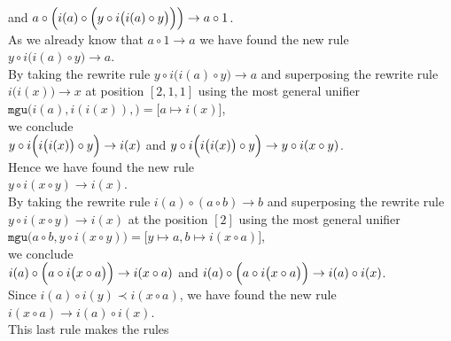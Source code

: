 \quad and \quad
$a \circ \Bigl(i(a) \circ \Bigl(y \circ i\bigl(i(a)\circ y\bigr)\Bigr)\Bigr) \rightarrow a \circ 1$.
\\[0.2cm]
As we already know that $a \circ 1 \rightarrow a$ we have found the new rule
\\[0.2cm]
\hspace*{1.3cm}
$y \circ i\bigl(i(a)\circ y\bigr) \rightarrow a$.
\\[0.2cm]
By taking the rewrite rule $y \circ i\bigl(i(a)\circ y\bigr) \rightarrow a$ and superposing the rewrite rule $i\bigl(i(x)\bigr)
\rightarrow x$ at
position $[2, 1, 1]$ using the most general unifier
\\[0.2cm]
\hspace*{1.3cm}
$\mathtt{mgu}\bigl(i(a), i(i(x)),\bigr) = \bigl[a \mapsto i(x)\bigr]$,
\\[0.2cm]
we conclude
\\[0.2cm]
\hspace*{1.3cm}
$y \circ i\Bigl(i\bigl(i(x)\bigr)\circ y\Bigr) \rightarrow i(x)$ \quad and \quad
$y \circ i\Bigl(i\bigl(i(x)\bigr)\circ y\Bigr) \rightarrow y \circ i(x \circ y)$.
\\[0.2cm]
Hence we have found the new rule
\\[0.2cm]
\hspace*{1.3cm}
$y \circ i(x \circ y) \rightarrow i(x)$.
\\[0.2cm]
By taking the rewrite rule  $i(a) \circ (a \circ b) \rightarrow b$ and superposing the rewrite rule $y \circ i(x \circ y) \rightarrow i(x)$
at the position $[2]$ using the most general unifier
\\[0.2cm]
\hspace*{1.3cm}
$\mathtt{mgu}\bigl(a \circ b, y \circ i(x \circ y)\bigr) = \bigl[y \mapsto a, b \mapsto i(x \circ a)\bigr]$, 
\\[0.2cm]
we conclude
\\[0.2cm]
\hspace*{1.3cm}
$i(a) \circ \Bigl(a \circ i\bigl(x \circ a\bigr)\Bigr) \rightarrow i(x \circ a)$ \quad and \quad
$i(a) \circ \Bigl(a \circ i\bigl(x \circ a\bigr)\Bigr) \rightarrow i(a) \circ i(x)$.
\\[0.2cm]
Since $i(a) \circ i(y) \prec i(x \circ a)$, we have found the new rule
\\[0.2cm]
\hspace*{1.3cm}
$i(x \circ a) \rightarrow i(a) \circ i(x)$.
\\[0.2cm]
This last rule makes the rules
\\[0.2cm]
\hspace*{1.3cm}
